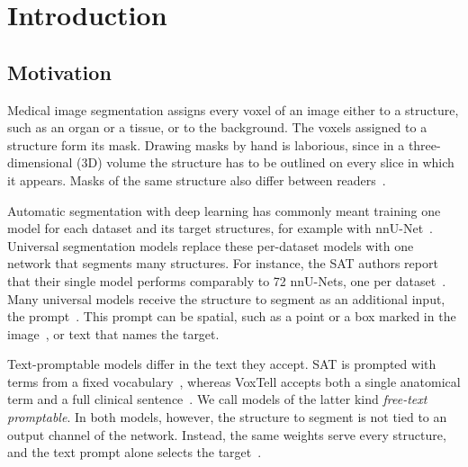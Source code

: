 %

\chapter{Introduction}
\label{chap:intro}

\section{Motivation}
\label{sec:intro-motivation}

Medical image segmentation assigns every voxel of an image either to a structure, such as an organ or a tissue, or to the background.
The voxels assigned to a structure form its mask.
Drawing masks by hand is laborious, since in a three-dimensional (3D) volume the structure has to be outlined on every slice in which it appears.
Masks of the same structure also differ between readers~\cite{desai2021skmtea}.

Automatic segmentation with deep learning has commonly meant training one model for each dataset and its target structures, for example with nnU-Net~\cite{isensee2018nnunetselfadaptingframeworkunetbased}.
Universal segmentation models replace these per-dataset models with one network that segments many structures.
For instance, the SAT authors report that their single model performs comparably to 72 nnU-Nets, one per dataset~\cite{zhao2025sat}.
Many universal models receive the structure to segment as an additional input, the prompt~\cite{zhao2025sat,rokuss2025voxtellfreetextpromptableuniversal}.
This prompt can be spatial, such as a point or a box marked in the image~\cite{Ma_2024,cheng2023sammed2d}, or text that names the target.

Text-promptable models differ in the text they accept.
SAT is prompted with terms from a fixed vocabulary~\cite{zhao2025sat}, whereas VoxTell accepts both a single anatomical term and a full clinical sentence~\cite{rokuss2025voxtellfreetextpromptableuniversal}.
We call models of the latter kind \emph{free-text promptable}.
In both models, however, the structure to segment is not tied to an output channel of the network.
Instead, the same weights serve every structure, and the text prompt alone selects the target~\cite{zhao2025sat,rokuss2025voxtellfreetextpromptableuniversal}.

